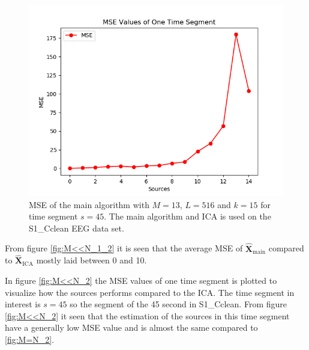 \begin{figure}[H]
\centering
\includegraphics[scale=0.5]{figures/ch_7/MSE_2M_N.png}
\caption{MSE of the main algorithm with $M=13$, $L = 516$ and $k=15$ for time segment $s=45$. The main algorithm and ICA is used on the S1\_Cclean EEG data set.}
	\label{fig:M<<N_2}
\label{fig:M<N_2}
\end{figure}
\noindent
From figure \ref{fig:M<<N_1_2} it is seen that the average MSE of $\hat{\mathbf{X}}_{\text{main}}$ compared to $\hat{\mathbf{X}}_{\text{ICA}}$ mostly laid between 0 and 10. 

In figure \ref{fig:M<<N_2} the MSE values of one time segment is plotted to visualize how the sources performs compared to the ICA. The time segment in interest is $s = 45$ so the segment of the 45 second in S1\_Cclean. 
From figure \ref{fig:M<<N_2} it seen that the estimation of the sources in this time segment have a generally low MSE value and is almost the same compared to \ref{fig:M=N_2}. 

